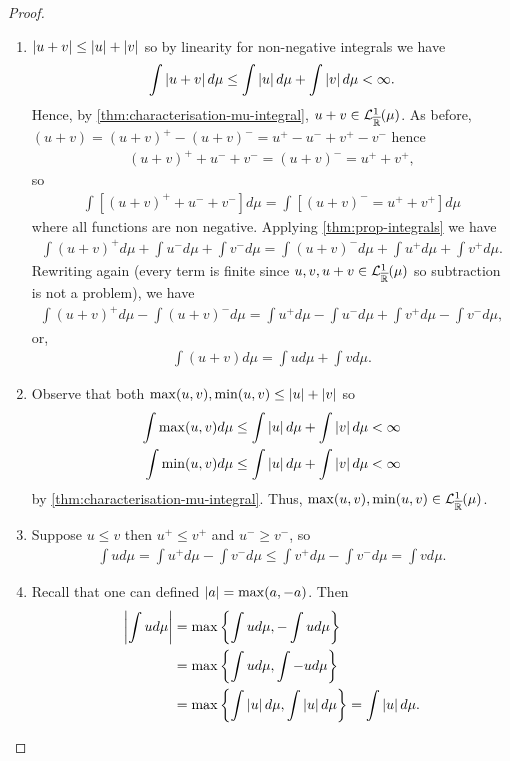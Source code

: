 \begin{proof}
\begin{enumerate}
		\item $\left\vert{u + v}\right\vert \leq \left\vert{u}\right\vert + \left\vert{v}\right\vert$ so by linearity for non-negative integrals we have
		\begin{align*}
			\int \left\vert{u + v}\right\vert d\mu \leq \int \left\vert{u}\right\vert d\mu  + \int \left\vert{v}\right\vert d\mu < \infty.
		\end{align*}
		Hence, by \autoref{thm:characterisation-mu-integral}, $u + v \in \mathcal{L}^1_{\overline{\mathbb{R}}}(\mu)$. As before, $(u + v) = (u + v)^+ - (u + v)^- = u^+ - u^- + v^+ - v^-$ hence
		\begin{align*}
			(u + v)^+ + u^- + v^- =  (u + v)^- = u^+ + v^+,
		\end{align*}
		so
		\begin{align*}
			\int \left[(u + v)^+ + u^- + v^-\right]d\mu =  \int \left[(u + v)^- = u^+ + v^+\right] d\mu
		\end{align*}
		where all functions are non negative. Applying \autoref{thm:prop-integrals} we have
		\begin{align*}
			\int (u + v)^+ d\mu + \int u^- d\mu + \int v^- d\mu = \int (u+v)^- d\mu + \int u^+ d\mu + \int v^+ d\mu.
		\end{align*}
		Rewriting again (every term is finite since $u, v, u+v \in \mathcal{L}^1_{\overline{\mathbb{R}}}(\mu)$ so subtraction is not a problem), we have
		\begin{align*}
			\int (u + v)^+d\mu - \int (u + v)^- d\mu = \int u^+ d\mu - \int u^- d\mu + \int v^+ d\mu - \int v^- d\mu,
		\end{align*}
		or,
		\begin{align*}
			\int (u + v)d\mu = \int u d\mu + \int v d\mu.
		\end{align*}
		
		\item Observe that both $\max(u, v), \min (u, v) \leq \left\vert{u}\right\vert + \left\vert{v}\right\vert$ so
		\begin{align*}
			\int \max(u, v) d\mu &\leq \int \left\vert{u}\right\vert d\mu + \int \left\vert{v}\right\vert d\mu < \infty\\
			\int \min(u, v) d\mu &\leq \int \left\vert{u}\right\vert d\mu + \int \left\vert{v}\right\vert d\mu < \infty
		\end{align*}
		by \autoref{thm:characterisation-mu-integral}. Thus, $\max(u, v), \min(u, v) \in \mathcal{L}^1_{\overline{\mathbb{R}}}(\mu)$.
		
		\item Suppose $u \leq v$ then $u^+ \leq v^+$ and $u^- \geq v^-$, so
		\begin{align*}
			\int u d\mu
			= \int u^+ d\mu - \int v^- d\mu \leq \int v^+ d\mu - \int v^- d\mu = \int v d\mu.
		\end{align*}
		
		\item Recall that one can defined $\left\vert{a}\right\vert = \max (a , -a)$. Then
		\begin{align*}
			\left\vert{\int u d\mu}\right\vert
			&= \max \left\{ \int u d\mu, -\int u d\mu \right\} \\
			&= \max \left\{ \int u d\mu, \int -u d\mu \right\} \\
			&= \max \left\{ \int \left\vert{u}\right\vert d \mu, \int \left\vert{u}\right\vert d\mu \right\}
			= \int \left\vert{u}\right\vert d\mu.
		\end{align*}
	\end{enumerate}
\end{proof}

